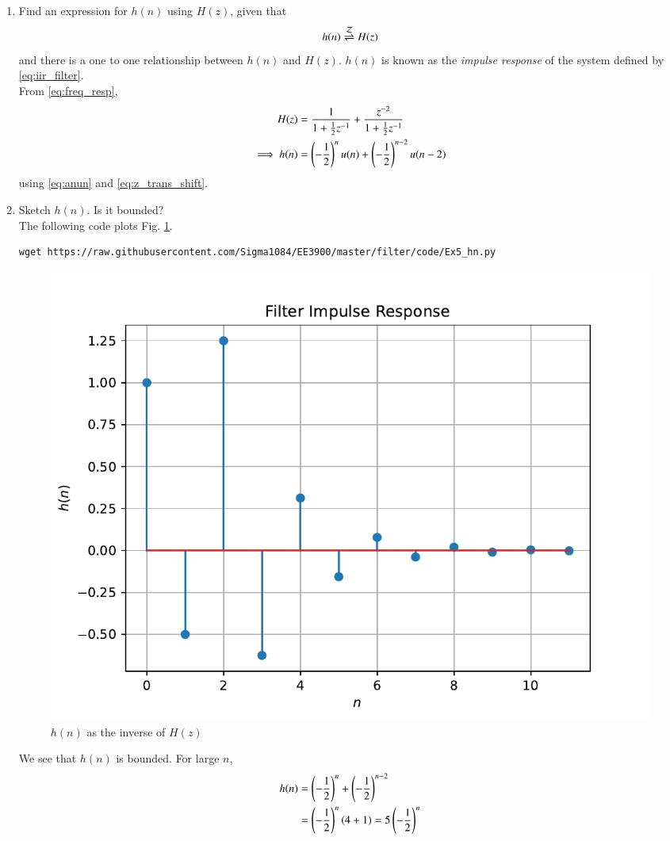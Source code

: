 \documentclass[journal,12pt,twocolumn]{IEEEtran}
\renewcommand\thesection{\arabic{section}}
\begin{document}
\begin{enumerate}[label=\thesection.\arabic*]
\item \label{prob:impulse_resp}
Find an expression for $h(n)$ using $H(z)$, given that 
\begin{equation}
\label{eq:impulse_resp}
h(n) \overset{\mathcal{Z}}{ \rightleftharpoons} H(z)
\end{equation}
and there is a one to one relationship between $h(n)$ and $H(z)$. $h(n)$ is known as the {\em impulse response} of the
system defined by \eqref{eq:iir_filter}.
\\
\solution From \eqref{eq:freq_resp},
\begin{align}
H(z) &= \frac{1}{1 + \frac{1}{2}z^{-1}} + \frac{ z^{-2}}{1 + \frac{1}{2}z^{-1}}
\\
\implies h(n) &= \left(-\frac{1}{2}\right)^{n}u(n) + \left(-\frac{1}{2}\right)^{n-2}u(n-2)
\end{align}
using \eqref{eq:anun} and \eqref{eq:z_trans_shift}.
\item Sketch $h(n)$. Is it bounded?
\\
\solution The following code plots Fig. \ref{fig:hn}.
\begin{lstlisting}
wget https://raw.githubusercontent.com/Sigma1084/EE3900/master/filter/code/Ex5_hn.py
\end{lstlisting}
\begin{figure}[!ht]
\centering
\includegraphics[width=\columnwidth]{./figs/hn}
\caption{$h(n)$ as the inverse of $H(z)$}
\label{fig:hn}
\end{figure}

We see that $h(n)$ is bounded. For large $n$,
\begin{align*}
	h(n) &= \left(-\frac{1}{2}\right)^n + \left(-\frac{1}{2}\right)^{n - 2} \\
		 &= \left(-\frac{1}{2}\right)^{n}\left(4 + 1\right) = 5\left(-\frac{1}{2}\right)^n
\end{align*}


\end{enumerate}
\end{document}

